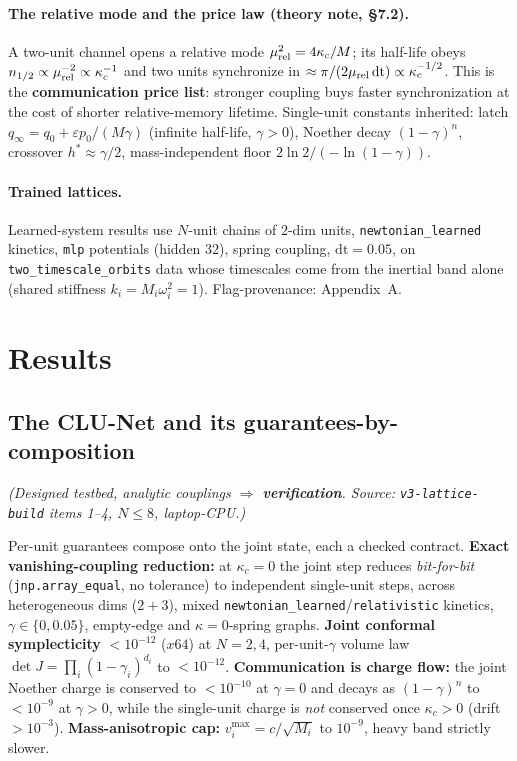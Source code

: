 \documentclass[11pt]{article}
\begin{document}
\paragraph{The relative mode and the price law (theory note, \S7.2).} A two-unit channel opens a relative mode $\mu_{\rm rel}^2=4\kappa_c/M$; its half-life obeys $n_{1/2}\propto\mu_{\rm rel}^{-2}\propto\kappa_c^{-1}$ and two units synchronize in $\approx\pi/(2\mu_{\rm rel}\,\mathrm{dt})\propto\kappa_c^{-1/2}$. This is the \textbf{communication price list}: stronger coupling buys faster synchronization at the cost of shorter relative-memory lifetime. Single-unit constants inherited: latch $q_\infty=q_0+\varepsilon p_0/(M\gamma)$ (infinite half-life, $\gamma>0$), Noether decay $(1-\gamma)^n$, crossover $h^*\approx\gamma/2$, mass-independent floor $2\ln2/(-\ln(1-\gamma))$.

\paragraph{Trained lattices.} Learned-system results use $N$-unit chains of $2$-dim units, \texttt{newtonian\_learned} kinetics, \texttt{mlp} potentials (hidden $32$), spring coupling, $\mathrm{dt}=0.05$, on \texttt{two\_timescale\_orbits} data whose timescales come from the inertial band alone (shared stiffness $k_i=M_i\omega_i^2=1$). Flag-provenance: Appendix~A.

\section{Results}
\subsection{The CLU-Net and its guarantees-by-composition}
\emph{(Designed testbed, analytic couplings $\Rightarrow$ \textbf{verification}. Source: \texttt{v3-lattice-build} items 1--4, $N\le8$, laptop-CPU.)}

Per-unit guarantees compose onto the joint state, each a checked contract. \textbf{Exact vanishing-coupling reduction:} at $\kappa_c=0$ the joint step reduces \emph{bit-for-bit} (\texttt{jnp.array\_equal}, no tolerance) to independent single-unit steps, across heterogeneous dims ($2{+}3$), mixed \texttt{newtonian\_learned}/\texttt{relativistic} kinetics, $\gamma\in\{0,0.05\}$, empty-edge and $\kappa{=}0$-spring graphs. \textbf{Joint conformal symplecticity} $<10^{-12}$ ($x64$) at $N=2,4$, per-unit-$\gamma$ volume law $\det J=\prod_i(1-\gamma_i)^{d_i}$ to $<10^{-12}$. \textbf{Communication is charge flow:} the joint Noether charge is conserved to $<10^{-10}$ at $\gamma=0$ and decays as $(1-\gamma)^n$ to $<10^{-9}$ at $\gamma>0$, while the single-unit charge is \emph{not} conserved once $\kappa_c>0$ (drift $>10^{-3}$). \textbf{Mass-anisotropic cap:} $v_i^{\max}=c/\sqrt{M_i}$ to $10^{-9}$, heavy band strictly slower.
\end{document}
